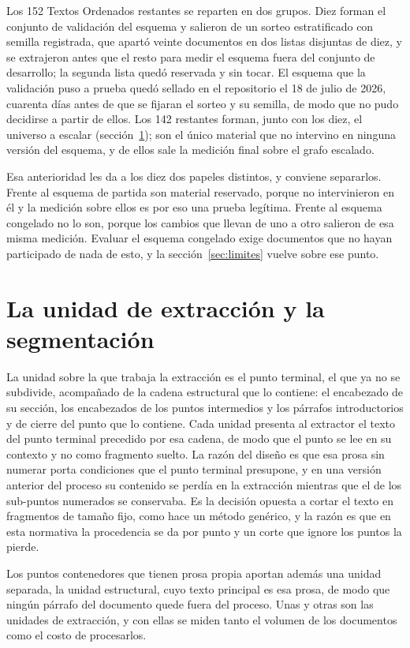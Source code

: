 \documentclass[12pt,a4paper]{report}
\begin{document}
Los 152 Textos Ordenados restantes se reparten en dos grupos. Diez forman el conjunto de validación del esquema y salieron de un sorteo estratificado con semilla registrada, que apartó veinte documentos en dos listas disjuntas de diez, y se extrajeron antes que el resto para medir el esquema fuera del conjunto de desarrollo; la segunda lista quedó reservada y sin tocar. El esquema que la validación puso a prueba quedó sellado en el repositorio el 18 de julio de 2026, cuarenta días antes de que se fijaran el sorteo y su semilla, de modo que no pudo decidirse a partir de ellos. Los 142 restantes forman, junto con los diez, el universo a escalar (sección~\ref{sec:segmentacion}); son el único material que no intervino en ninguna versión del esquema, y de ellos sale la medición final sobre el grafo escalado.

Esa anterioridad les da a los diez dos papeles distintos, y conviene separarlos. Frente al esquema de partida son material reservado, porque no intervinieron en él y la medición sobre ellos es por eso una prueba legítima. Frente al esquema congelado no lo son, porque los cambios que llevan de uno a otro salieron de esa misma medición. Evaluar el esquema congelado exige documentos que no hayan participado de nada de esto, y la sección~\ref{sec:limites} vuelve sobre ese punto.

\section{La unidad de extracción y la segmentación}
\label{sec:segmentacion}

La unidad sobre la que trabaja la extracción es el punto terminal, el que ya no se subdivide, acompañado de la cadena estructural que lo contiene: el encabezado de su sección, los encabezados de los puntos intermedios y los párrafos introductorios y de cierre del punto que lo contiene. Cada unidad presenta al extractor el texto del punto terminal precedido por esa cadena, de modo que el punto se lee en su contexto y no como fragmento suelto. La razón del diseño es que esa prosa sin numerar porta condiciones que el punto terminal presupone, y en una versión anterior del proceso su contenido se perdía en la extracción mientras que el de los sub-puntos numerados se conservaba. Es la decisión opuesta a cortar el texto en fragmentos de tamaño fijo, como hace un método genérico, y la razón es que en esta normativa la procedencia se da por punto y un corte que ignore los puntos la pierde.

Los puntos contenedores que tienen prosa propia aportan además una unidad separada, la unidad estructural, cuyo texto principal es esa prosa, de modo que ningún párrafo del documento quede fuera del proceso. Unas y otras son las unidades de extracción, y con ellas se miden tanto el volumen de los documentos como el costo de procesarlos.
\end{document}
